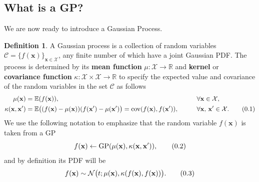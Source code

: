 \documentclass[10pt]{article}
\theoremstyle{definition}
\newtheorem{defn}{Definition}[section]
\newcommand\eqnum{\addtocounter{equation}{1}\tag{\arabic{section}.\arabic{equation}}}
\DeclareMathOperator{\cov}{cov}
\DeclareMathOperator{\gp}{GP}
\begin{document}
\subsection{What is a GP?}
We are now ready to introduce a Gaussian Process.
\begin{defn}
A Gaussian process is a collection of random variables $\mathscr{C} = \{f(\mathbf{x})\}_{\mathbf{x}\in\mathcal{X}}$, any finite number of which have a joint Gaussian PDF. The process is determined by its \textbf{mean function} $\mu: \mathcal{X} \to \mathbb{R}$ and \textbf{kernel} or \textbf{covariance function} $\kappa: \mathcal{X} \times\mathcal{X} \to \mathbb{R}$ to specify the expected value and covariance of the random variables in the set $\mathscr{C}$ as follows
\begin{alignat*}{2}
\mu(\mathbf{x}) &= \mathbb{E}(f(\mathbf{x})), && \forall \mathbf{x}\in\mathcal{X}, \\
\kappa(\mathbf{x},\mathbf{x}') &= \mathbb{E}\big((f(\mathbf{x})-\mu(\mathbf{x}))(f(\mathbf{x}')-\mu(\mathbf{x}')\big) = \cov(f(\mathbf{x}), f(\mathbf{x}')), \qquad && \forall \mathbf{x},\, \mathbf{x}'\in\mathcal{X}.
\eqnum
\label{eq:GP:def}
\end{alignat*}
We use the following notation to emphasize that the random variable $f(\mathbf{x})$ is taken from a GP
\begin{equation*}
f(\mathbf{x}) \leftarrow \gp(\mu(\mathbf{x}), \kappa(\mathbf{x},\mathbf{x}')),
\eqnum
\end{equation*}
and by definition its PDF will be
\begin{equation*}
f(\mathbf{x}) \sim \mathcal{N}\big(t; \mu(\mathbf{x}), \kappa(f(\mathbf{x}), f(\mathbf{x}))\big).
\eqnum
\end{equation*}
\end{defn}
\end{document}
